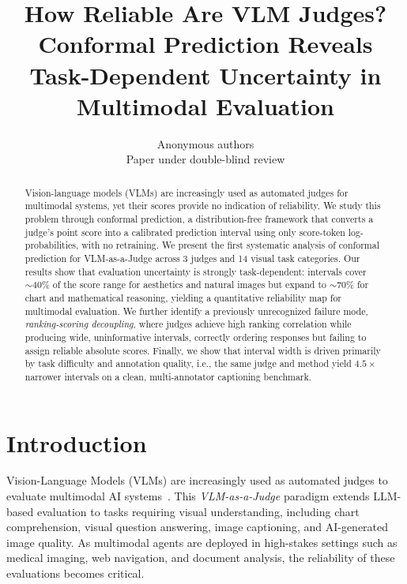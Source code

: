 \documentclass{article}
\title{How Reliable Are VLM Judges? Conformal Prediction Reveals Task-Dependent Uncertainty in Multimodal Evaluation}
\author{Anonymous authors\\Paper under double-blind review}
\begin{document}
\ifcolmsubmission
\linenumbers
\fi

\maketitle

\begin{abstract}
Vision-language models (VLMs) are increasingly used as automated judges for multimodal systems, yet their scores provide no indication of reliability. We study this problem through conformal prediction, a distribution-free framework that converts a judge's point score into a calibrated prediction interval using only score-token log-probabilities, with no retraining. 
We present the first systematic analysis of conformal prediction for VLM-as-a-Judge across 3 judges and 14 visual task categories. Our results show that evaluation uncertainty is strongly task-dependent: intervals cover $\sim 40\%$ of the score range for aesthetics and natural images but expand to $\sim 70\%$ for chart and mathematical reasoning, yielding a quantitative reliability map for multimodal evaluation. 
We further identify a previously unrecognized failure mode, \emph{ranking-scoring decoupling}, where judges achieve high ranking correlation while producing wide, uninformative intervals, correctly ordering responses but failing to assign reliable absolute scores. 
Finally, we show that interval width is driven primarily by task difficulty and annotation quality, i.e., the same judge and method yield $4.5\times$ narrower intervals on a clean, multi-annotator captioning benchmark. 
\end{abstract}

\section{Introduction}
\label{sec:intro}

Vision-Language Models (VLMs) are increasingly used as automated judges to evaluate multimodal AI systems~\citep{chen2024mllmasajudge,li2024vlrewardbench}. This \emph{VLM-as-a-Judge} paradigm extends LLM-based evaluation to tasks requiring visual understanding, including chart comprehension, visual question answering, image captioning, and AI-generated image quality. As multimodal agents are deployed in high-stakes settings such as medical imaging, web navigation, and document analysis, the reliability of these evaluations becomes critical. 
\end{document}
